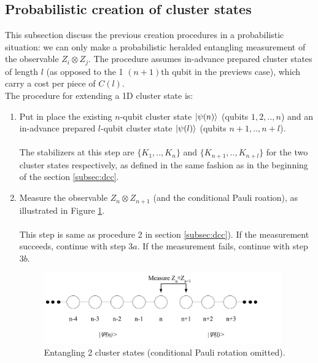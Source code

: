 \documentclass[letterpaper,10pt]{article}
\begin{document}
\subsection{Probabilistic creation of cluster states}
\label{subsec:pcc}
This subsection discuss the previous creation procedures in a probabilistic situation: we can only make a probabilistic heralded entangling measurement of the observable $Z_i \otimes Z_j$. The procedure assumes in-advance prepared cluster states of length $l$ (as opposed to the 1 $(n+1)$th qubit in the previews case), which carry a cost per piece of $C(l)$\cite{rrdoc}.\\
The procedure for extending a 1D cluster state is:
\begin{enumerate}
	\item 
	Put in place the existing $n$-qubit cluster state $\Ket{\psi(n)}$ (qubits $1,2,..,n$) and an in-advance prepared $l$-qubit cluster state $\Ket{\psi(l)}$ (qubits $n+1,..,n+l$). \\ \\
	The stabilizers at this step are $\{K_1,..,K_n\}$ and $\{K_{n+1},.., K_{n+l}\}$ for the two cluster states respectively, as defined in the same fashion as in the beginning of the section \ref{subsec:dcc}.
	
	\item 
	Measure the observable $Z_n \otimes Z_{n+1}$ (and the conditional Pauli roation), as illustrated in Figure \ref{fig:entangle}. \\ \\
	This step is same as procedure 2 in section \ref{subsec:dcc}). If the measurement succeeds, continue with step $3a$. If the measurement fails, continue
with step $3b$.

\begin{figure}[h]
\centering
         \includegraphics[height=1.2in]{entangling_1.jpg}
         \caption{Entangling 2 cluster states (conditional Pauli rotation omitted).}
         \label{fig:entangle}
\end{figure}


\end{enumerate}
\end{document}
